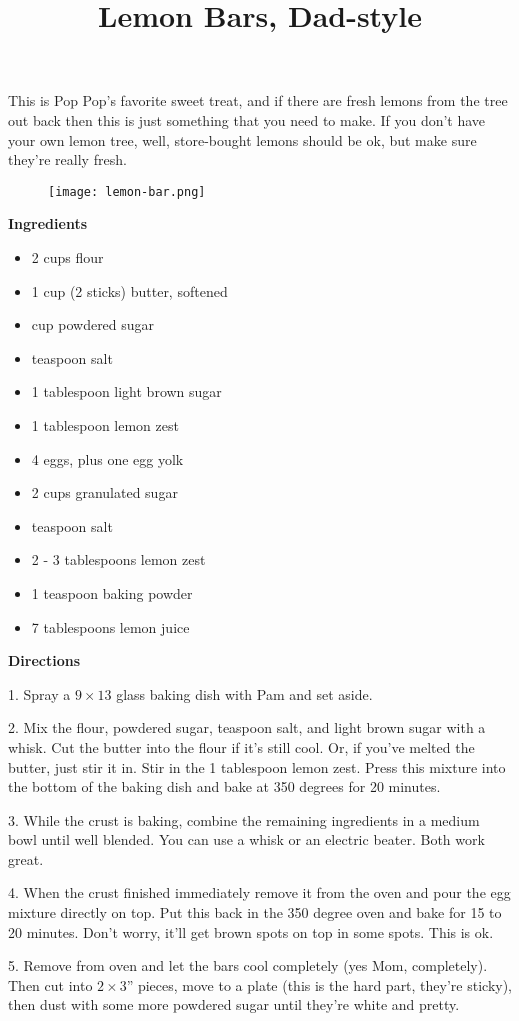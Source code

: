 \documentclass{article}
\title{Lemon Bars, Dad-style}
\begin{document}
This is Pop Pop's favorite sweet treat, and if there are fresh lemons from the tree out
back then this is just something that you need to make. If you don't have your own
lemon tree, well, store-bought lemons should be ok, but make sure they're really fresh.

\begin{figure}
    \centering
    \texttt{[image: lemon-bar.png]}
\end{figure}

\bigskip

\textbf{Ingredients}

\begin{multicols}{2}

    \begin{itemize}
        \item 2 cups flour
        \item 1 cup (2 sticks) butter, softened
        \item {} cup powdered sugar
        \item {} teaspoon salt
        \item 1 tablespoon light brown sugar
        \item 1 tablespoon lemon zest

              \columnbreak

        \item 4 eggs, plus one egg yolk
        \item 2 cups granulated sugar
        \item {} teaspoon salt
        \item 2 - 3 tablespoons lemon zest
        \item 1 teaspoon baking powder
        \item 7 tablespoons lemon juice
    \end{itemize}

\end{multicols}

\textbf{Directions}

1. Spray a $9\times13$ glass baking dish with Pam and set aside.

2. Mix the flour, powdered sugar,  teaspoon salt, and light brown sugar
with a whisk. Cut the butter into the flour if it's still cool. Or, if you've melted
the butter, just stir it in. Stir in the 1 tablespoon lemon zest. Press this mixture
into the bottom of the baking dish and bake at 350 degrees for 20 minutes.

3. While the crust is baking, combine the remaining ingredients in a medium bowl until
well blended. You can use a whisk or an electric beater. Both work great.

4. When the crust finished immediately remove it from the oven and pour the egg mixture
directly on top. Put this back in the 350 degree oven and bake for 15 to 20 minutes. Don't
worry, it'll get brown spots on top in some spots. This is ok.

5. Remove from oven and let the bars cool completely (yes Mom, completely). Then cut into
$2\times3$'' pieces, move to a plate (this is the hard part, they're sticky), then dust
with some more powdered sugar until they're white and pretty.
\end{document}

